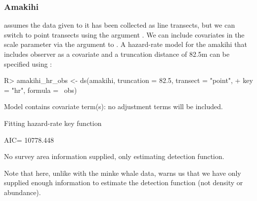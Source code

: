 \documentclass[article]{jss}\usepackage[]{graphicx}\usepackage[]{color}
\begin{document}
\subsubsection{Amakihi}

 assumes the data given to it has been collected as line transects, but we can switch to point transects using the argument . We can include covariates in the scale parameter via the  argument to . A hazard-rate model for the amakihi that includes observer as a covariate and a truncation distance of 82.5m \citep{Marques:2007ey} can be specified using :
\begin{Schunk}
\begin{Sinput}
R> amakihi_hr_obs <- ds(amakihi, truncation = 82.5, transect = "point",
+                      key = "hr", formula = ~obs)
\end{Sinput}
\begin{Soutput}
Model contains covariate term(s): no adjustment terms will be included.
\end{Soutput}
\begin{Soutput}
Fitting hazard-rate key function
\end{Soutput}
\begin{Soutput}
AIC= 10778.448
\end{Soutput}
\begin{Soutput}
No survey area information supplied, only estimating detection function.
\end{Soutput}
\end{Schunk}
Note that here, unlike with the minke whale data,  warns us that we have only supplied enough information to estimate the detection function (not density or abundance).
\end{document}
